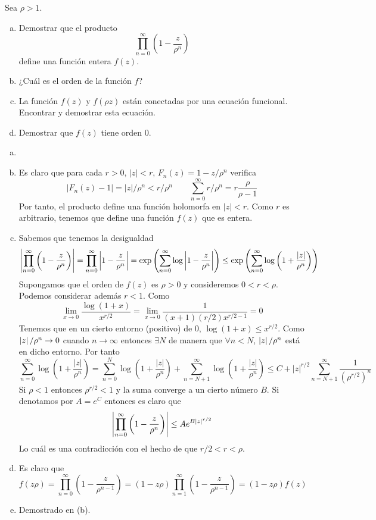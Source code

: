 \documentclass[twoside]{article}
\begin{document}
\newpage

\begin{ejercicio}{3}
Sea $\rho>1$.
\begin{enumerate}[(a)]
\item Demostrar que el producto
$$
\prod_{n=0}^\infty \left(1-\frac{z}{\rho^n}\right) 
$$
define una función entera $f(z)$.
\item ¿Cuál es el orden de la función $f$?
\item La función $f(z)$ y $f(\rho z)$ están conectadas por una ecuación funcional. Encontrar y demostrar esta ecuación.
\item Demostrar que $f(z)$ tiene orden $0$.
\end{enumerate}
\end{ejercicio}
\begin{solucion}
\begin{enumerate}[(a)]
\item[]
\item Es claro que para cada $r>0$, $|z|< r$, $F_n(z)=1-z/\rho^n$ verifica 
$$
|F_n(z)-1| = |z|/\rho^n < r/\rho^n \qquad \sum_{n=0}^\infty r/\rho^n = r \frac{\rho}{\rho-1}
$$
Por tanto, el producto define una función holomorfa en $|z|<r$. Como $r$ es arbitrario, tenemos que define una función $f(z)$ que es entera.
\item Sabemos que tenemos la desigualdad
$$
\left\lvert\prod_{n=0}^\infty \left(1-\frac{z}{\rho^n}\right)\right\rvert  = \prod_{n=0}^\infty \left\lvert1-\frac{z}{\rho^n}\right\rvert = \exp\left(\sum_{n=0}^\infty \log \left\lvert1-\frac{z}{\rho^n}\right\rvert\right) \leq  \exp\left(\sum_{n=0}^\infty \log \left({1+\frac{|z|}{\rho^n}}\right)\right)
$$
Supongamos que el orden de $f(z)$ es $\rho>0$ y consideremos $0<r<\rho$. Podemos considerar además $r<1$. Como 
$$
\lim_{x\to 0} \frac{\log(1+x)}{x^{r/2}} = \lim_{x\to 0} \frac{1}{{(x+1)(r/2)x^{r/2-1}}} = 0 
$$
Tenemos que en un cierto entorno (positivo) de $0$, $\log(1+x)\leq x^{r/2}$. Como $\left\lvert z\right\rvert/\rho^n\to 0$ cuando $n\to \infty$ entonces $\exists N$ de manera que $\forall n <N$, $\left\lvert z\right\rvert/\rho^n$ está en dicho entorno. Por tanto
$$
\sum_{n=0}^\infty \log \left({1+\frac{|z|}{\rho^n}}\right) = \sum_{n=0}^N \log \left({1+\frac{|z|}{\rho^n}}\right)+\sum_{n=N+1}^\infty \log \left({1+\frac{|z|}{\rho^n}}\right) \leq C + |z|^{r/2}\sum_{n=N+1}^\infty \frac{1}{(\rho^{r/2})^n}
$$
Si $\rho<1$ entonces $\rho^{r/2}<1$ y la suma converge a un cierto número $B$. Si denotamos por $A=e^C$ entonces es claro que
$$
\left\lvert\prod_{n=0}^\infty \left(1-\frac{z}{\rho^n}\right)\right\rvert \leq Ae^{B|z|^{r/2}}
$$
Lo cuál es una contradicción con el hecho de que $r/2<r<\rho$.
\item Es claro que 
$$
f(z\rho) = \prod_{n=0}^\infty  \left(1-\frac{z}{\rho^{n-1}}\right)  = (1-z\rho)\prod_{n=1}^\infty  \left(1-\frac{z}{\rho^{n-1}}\right)  = (1-z\rho)f(z)
$$
\item Demostrado en (b).
\end{enumerate}
\end{solucion}
\end{document}
